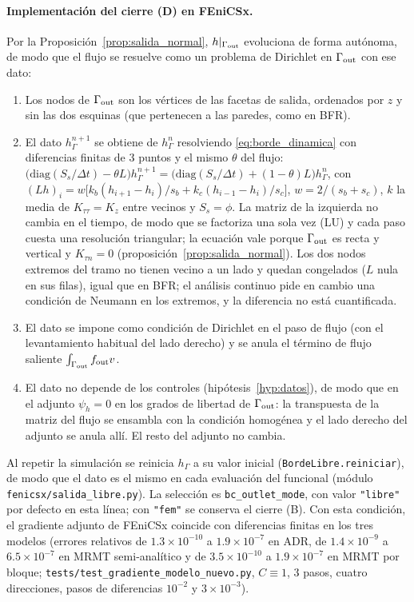 \documentclass[11pt]{article}
\numberwithin{equation}{section}
\theoremstyle{plain}
\theoremstyle{definition}
\theoremstyle{remark}
\begin{document}
\paragraph{Implementación del cierre (D) en FEniCSx.} Por la Proposición~\ref{prop:salida_normal}, $h|_{\Gamma_{\rm out}}$ evoluciona de forma autónoma, de modo que el flujo se resuelve como un problema de Dirichlet en $\Gamma_{\rm out}$ con ese dato:
\begin{enumerate}[label=(\arabic*),nosep]
\item Los nodos de $\Gamma_{\rm out}$ son los vértices de las facetas de salida, ordenados por $z$ y sin las dos esquinas (que pertenecen a las paredes, como en BFR).
\item El dato $h_\Gamma^{n+1}$ se obtiene de $h_\Gamma^n$ resolviendo \eqref{eq:borde_dinamica} con diferencias finitas de 3 puntos y el mismo $\theta$ del flujo:
$\bigl(\mathrm{diag}(S_s/\Delta t)-\theta L\bigr)h_\Gamma^{n+1}=\bigl(\mathrm{diag}(S_s/\Delta t)+(1-\theta)L\bigr)h_\Gamma^{n}$, con $(Lh)_i=w\bigl[k_b(h_{i+1}-h_i)/s_b+k_c(h_{i-1}-h_i)/s_c\bigr]$, $w=2/(s_b+s_c)$, $k$ la media de $K_{\tau\tau}=K_z$ entre vecinos y $S_s=\phi$. La matriz de la izquierda no cambia en el tiempo, de modo que se factoriza una sola vez (LU) y cada paso cuesta una resolución triangular; la ecuación vale porque $\Gamma_{\rm out}$ es recta y vertical y $K_{\tau n}=0$ (proposición~\ref{prop:salida_normal}). Los dos nodos extremos del tramo no tienen vecino a un lado y quedan congelados ($L$ nula en sus filas), igual que en BFR; el análisis continuo pide en cambio una condición de Neumann en los extremos, y la diferencia no está cuantificada.
\item El dato se impone como condición de Dirichlet en el paso de flujo (con el levantamiento habitual del lado derecho) y se anula el término de flujo saliente $\int_{\Gamma_{\rm out}}f_{\rm out}v$.
\item El dato no depende de los controles (hipótesis~\ref{hyp:datos}), de modo que en el adjunto $\psi_h=0$ en los grados de libertad de $\Gamma_{\rm out}$: la transpuesta de la matriz del flujo se ensambla con la condición homogénea y el lado derecho del adjunto se anula allí. El resto del adjunto no cambia.
\end{enumerate}
Al repetir la simulación se reinicia $h_\Gamma$ a su valor inicial (\texttt{BordeLibre.reiniciar}), de modo que el dato es el mismo en cada evaluación del funcional (módulo \texttt{fenicsx/salida\_libre.py}). La selección es \texttt{bc\_outlet\_mode}, con valor \texttt{"libre"} por defecto en esta línea; con \texttt{"fem"} se conserva el cierre (B). Con esta condición, el gradiente adjunto de FEniCSx coincide con diferencias finitas en los tres modelos (errores relativos de $1.3\times10^{-10}$ a $1.9\times10^{-7}$ en ADR, de $1.4\times10^{-9}$ a $6.5\times10^{-7}$ en MRMT semi-analítico y de $3.5\times10^{-10}$ a $1.9\times10^{-7}$ en MRMT por bloque; \texttt{tests/test\_gradiente\_modelo\_nuevo.py}, $C\equiv1$, 3 pasos, cuatro direcciones, pasos de diferencias $10^{-2}$ y $3\times10^{-3}$).
\end{document}
